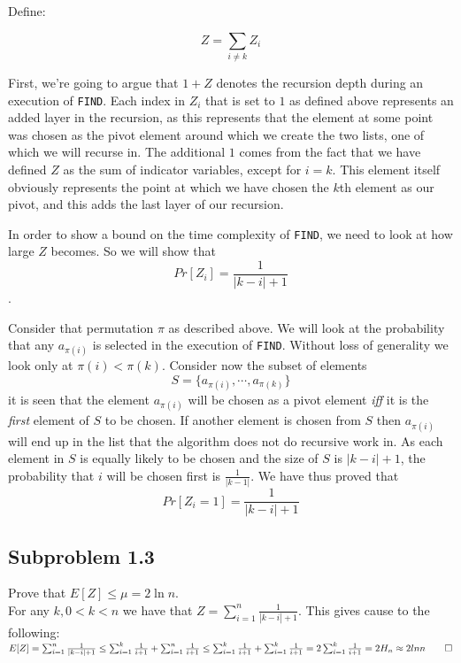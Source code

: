 \documentclass[article,a4paper,oneside]{memoir}
\newcommand{\+}[1]{\ensuremath{\boldsymbol{#1}}}
\begin{document}
Define:

$$Z=\sum_{i\neq k} Z_i$$

First, we're going to argue that $1+Z$ denotes the recursion depth during an execution of \texttt{FIND}. Each index in $Z_i$ that is set to $1$ as defined above represents an added layer in the recursion, as this represents that the element at some point was chosen as the pivot element around which we create the two lists, one of which we will recurse in. The additional $1$ comes from the fact that we have defined $Z$ as the sum of indicator variables, except for $i=k$. This element itself obviously represents the point at which we have chosen the $k$th element as our pivot, and this adds the last layer of our recursion.
\par
In order to show a bound on the time complexity of \texttt{FIND}, we need to look at how large $Z$ becomes. So we will show that $$Pr[Z_{i}]=\frac{1}{|k-i|+1}$$.
\par
Consider that permutation $\pi$ as described above. We will look at the probability that any $a_{\pi(i)}$ is selected in the execution of \texttt{FIND}. Without loss of generality we look only at $\pi(i) < \pi(k)$. Consider now the subset of elements $$S = \lbrace a_{\pi(i)},\cdots,a_{\pi(k)}\rbrace$$ it is seen that the element $a_{\pi(i)}$ will be chosen as a pivot element \emph{iff} it is the \emph{first} element of $S$ to be chosen. If another element is chosen from $S$ then $a_{\pi(i)}$ will end up in the list that the algorithm does not do recursive work in. As each element in $S$ is equally likely to be chosen and the size of $S$ is $|k - i| + 1$, the probability that $i$ will be chosen first is $\frac{1}{|k -1|}$. We have thus proved that $$Pr[Z_{i} = 1] = \frac{1}{|k-i|+1}$$



\subsection{Subproblem 1.3} 
Prove that $E[Z]\leq \mu = 2\ln n$.\\
For any $k, 0<k<n$ we have that $Z = \sum_{i=1}^{n} \frac{1}{|k-i|+1}$.
This gives cause to the following:
$E[Z] = \sum_{i=1}^{n} \frac{1}{|k-i|+1}
\\ \leq \sum_{i=1}^{k} \frac{1}{i+1} + \sum_{i=1}^{n} \frac{1}{i+1}
\\ \leq \sum_{i=1}^{k} \frac{1}{i+1} + \sum_{i=1}^{k} \frac{1}{i+1}
\\ = 2\sum_{i=1}^{k} \frac{1}{i+1}
\\ = 2H_n
\\ \approx 2lnn \qedhere$
\end{document}

